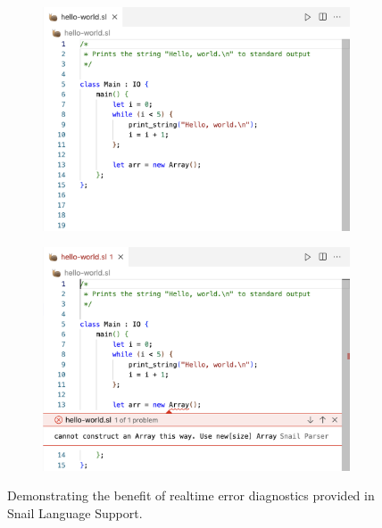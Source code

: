 \documentclass{article}
\begin{document}
\begin{figure}[t]
    \begin{subfigure}{0.45\textwidth}
        \begin{center}
            \includegraphics[width=\textwidth]{dev-no-diagnostics-light.png}
            \label{fig:dev-no-diagnostics}
        \end{center}
    \end{subfigure}
    \hspace{0.05\textwidth}
    \begin{subfigure}{0.45\textwidth}
        \begin{center}
            \includegraphics[width=\textwidth]{dev-with-diagnostics-light.png}
            \label{fig:dev-with-diagnostics}
        \end{center}
    \end{subfigure}
    \caption{
        \centering
            Demonstrating the benefit of realtime error diagnostics provided in Snail Language Support.
        }
    \label{fig:dev-diagnostics}
\end{figure}
\end{document}
